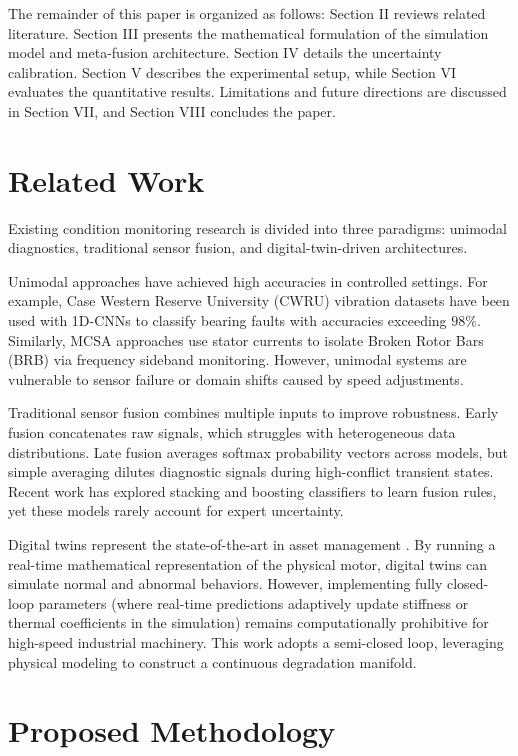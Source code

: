 \documentclass[journal]{IEEEtran}
\begin{document}
The remainder of this paper is organized as follows: Section II reviews related literature. Section III presents the mathematical formulation of the simulation model and meta-fusion architecture. Section IV details the uncertainty calibration. Section V describes the experimental setup, while Section VI evaluates the quantitative results. Limitations and future directions are discussed in Section VII, and Section VIII concludes the paper.

\section{Related Work}
Existing condition monitoring research is divided into three paradigms: unimodal diagnostics, traditional sensor fusion, and digital-twin-driven architectures.

Unimodal approaches have achieved high accuracies in controlled settings. For example, Case Western Reserve University (CWRU) vibration datasets have been used with 1D-CNNs to classify bearing faults with accuracies exceeding $98\%$. Similarly, MCSA approaches use stator currents to isolate Broken Rotor Bars (BRB) via frequency sideband monitoring. However, unimodal systems are vulnerable to sensor failure or domain shifts caused by speed adjustments.

Traditional sensor fusion combines multiple inputs to improve robustness. Early fusion concatenates raw signals, which struggles with heterogeneous data distributions. Late fusion averages softmax probability vectors across models, but simple averaging dilutes diagnostic signals during high-conflict transient states. Recent work has explored stacking and boosting classifiers to learn fusion rules, yet these models rarely account for expert uncertainty.

Digital twins represent the state-of-the-art in asset management \cite{digital_twin_grieves}. By running a real-time mathematical representation of the physical motor, digital twins can simulate normal and abnormal behaviors. However, implementing fully closed-loop parameters (where real-time predictions adaptively update stiffness or thermal coefficients in the simulation) remains computationally prohibitive for high-speed industrial machinery. This work adopts a semi-closed loop, leveraging physical modeling to construct a continuous degradation manifold.

\section{Proposed Methodology}
\end{document}
